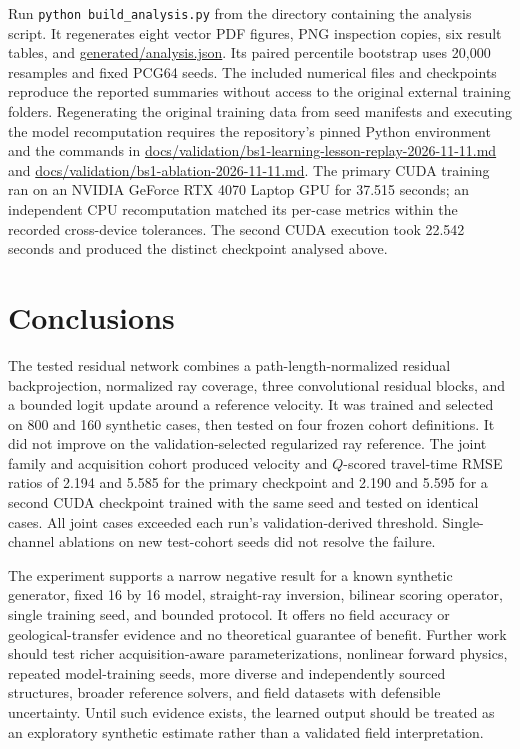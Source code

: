 \documentclass[11pt]{article}
\begin{document}
Run \texttt{python}\ \texttt{build\_analysis.py} from the directory containing the analysis script. It regenerates eight vector PDF figures, PNG inspection copies, six result tables, and \url{generated/analysis.json}. Its paired percentile bootstrap uses 20,000 resamples and fixed PCG64 seeds. The included numerical files and checkpoints reproduce the reported summaries without access to the original external training folders. Regenerating the original training data from seed manifests and executing the model recomputation requires the repository's pinned Python environment and the commands in \url{docs/validation/bs1-learning-lesson-replay-2026-11-11.md} and \url{docs/validation/bs1-ablation-2026-11-11.md}. The primary CUDA training ran on an NVIDIA GeForce RTX 4070 Laptop GPU for 37.515 seconds; an independent CPU recomputation matched its per-case metrics within the recorded cross-device tolerances. The second CUDA execution took 22.542 seconds and produced the distinct checkpoint analysed above.

\section{Conclusions}
\label{sec:conclusions}
The tested residual network combines a path-length-normalized residual backprojection, normalized ray coverage, three convolutional residual blocks, and a bounded logit update around a reference velocity. It was trained and selected on 800 and 160 synthetic cases, then tested on four frozen cohort definitions. It did not improve on the validation-selected regularized ray reference. The joint family and acquisition cohort produced velocity and $Q$-scored travel-time RMSE ratios of 2.194 and 5.585 for the primary checkpoint and 2.190 and 5.595 for a second CUDA checkpoint trained with the same seed and tested on identical cases. All joint cases exceeded each run's validation-derived threshold. Single-channel ablations on new test-cohort seeds did not resolve the failure.

The experiment supports a narrow negative result for a known synthetic generator, fixed 16 by 16 model, straight-ray inversion, bilinear scoring operator, single training seed, and bounded protocol. It offers no field accuracy or geological-transfer evidence and no theoretical guarantee of benefit. Further work should test richer acquisition-aware parameterizations, nonlinear forward physics, repeated model-training seeds, more diverse and independently sourced structures, broader reference solvers, and field datasets with defensible uncertainty. Until such evidence exists, the learned output should be treated as an exploratory synthetic estimate rather than a validated field interpretation.
\end{document}
